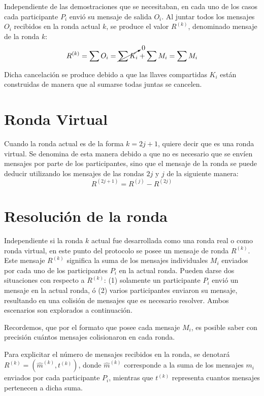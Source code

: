 Independiente de las demostraciones que se necesitaban, en cada uno de los casos 
cada participante $P_i$ envió su mensaje de salida $O_i$. Al juntar todos los 
mensajes $O_i$ recibidos en la ronda actual $k$, se produce el valor $R^{(k)}$, 
denominado mensaje de la ronda 
$k$: $$R^{(k)} = \sum O_i = \cancelto{0}{\sum K_i} + \sum M_i = \sum M_i$$

Dicha cancelación se produce debido a que las llaves compartidas $K_i$ están 
construidas de manera que al sumarse todas juntas se cancelen.

\section{Ronda Virtual}

Cuando la ronda actual es de la forma $k = 2j + 1$, quiere decir que es una ronda 
virtual. Se denomina de esta manera debido a que no es necesario que se envíen 
mensajes por parte de los participantes, sino que el mensaje de la ronda se puede 
deducir utilizando los mensajes de las rondas $2j$ y $j$ de la siguiente manera: 
$$R^{(2j + 1)} = R^{(j)} - R^{(2j)}$$


\section{Resolución de la ronda}

Independiente si la ronda $k$ actual fue desarrollada como una ronda real o como 
ronda virtual, en este punto del protocolo se posee un mensaje de ronda $R^{(k)}$. 
Este mensaje $R^{(k)}$ significa la suma de los mensajes individuales $M_i$ 
enviados por cada uno de los participantes $P_i$ en la actual ronda. Pueden darse 
dos situaciones con respecto a $R^{(k)}$: (1) solamente un participante $P_i$ envió 
un mensaje en la actual ronda, ó (2) varios participantes enviaron su mensaje, 
resultando en una colisión de mensajes que es necesario resolver. Ambos escenarios 
son explorados a continuación.

Recordemos, que por el formato que posee cada mensaje $M_i$, es posible saber con 
precisión cuántos mensajes colisionaron en cada ronda.


Para explicitar el número de mensajes recibidos en la ronda, se denotará 
$R^{(k)} = (\hat{m}^{(k)}, t^{(k)})$, donde $\hat{m}^{(k)}$ corresponde a la suma de 
los mensajes $m_i$ enviados por cada participante $P_i$, mientras que $t^{(k)}$ 
representa cuantos mensajes pertenecen a dicha suma.

